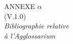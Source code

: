 \documentclass[1pt, onecolumn, oneside, a4paper] {book}
\begin{document}
\begin{center}


\thispagestyle{empty}
{\fontsize{30}{48}\selectfont ANNEXE $\alpha$ \\ 
\vspace{8mm}
\Large (V.1.0)\\ 
\vspace{5mm}
\Huge{}\selectfont
{\textit{Bibliographie relative\\ à l'Agglossarium}}}\\
\vspace{15cm}
\vspace{\fill}
\end{center}

\newpage



	
\end{document}

